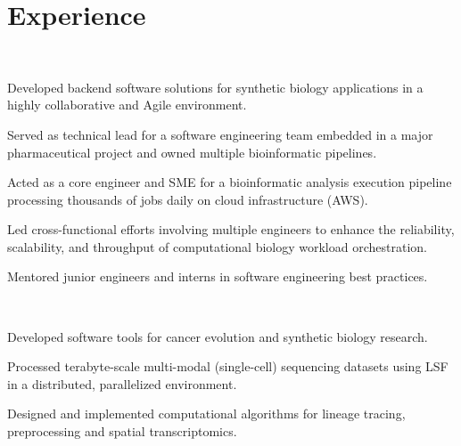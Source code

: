 \documentclass[]{resume}
\begin{document}
\begin{minipage}[t]{0.69\textwidth}


\section{Experience}
\\
\vspace{\topsep} %
\begin{tightemize}
    \item{Developed backend software solutions for synthetic biology applications in a highly collaborative and Agile environment.}
    \item{Served as technical lead for a software engineering team embedded in a major pharmaceutical project and owned multiple bioinformatic pipelines.}
    \item{Acted as a core engineer and SME for a bioinformatic analysis execution pipeline processing thousands of jobs daily on cloud infrastructure (AWS).}
    \item{Led cross-functional efforts involving multiple engineers to enhance the reliability, scalability, and throughput of computational biology workload orchestration.}
    \item{Mentored junior engineers and interns in software engineering best practices.}
\end{tightemize}
\sectionsep

\\
\begin{tightemize}
    \item{Developed software tools for cancer evolution and synthetic biology research.}
    \item{Processed terabyte-scale multi-modal (single-cell) sequencing datasets using LSF in a distributed, parallelized environment.}
    \item{Designed and implemented computational algorithms for lineage tracing, preprocessing and spatial transcriptomics.}
\end{tightemize}
\sectionsep


\end{minipage}
\end{document}
